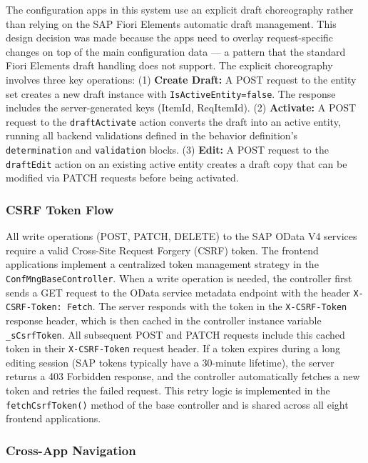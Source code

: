 \documentclass[12pt,a4paper]{report}
\begin{document}
The configuration apps in this system use an explicit draft choreography rather than relying on the SAP Fiori Elements automatic draft management. This design decision was made because the apps need to overlay request-specific changes on top of the main configuration data --- a pattern that the standard Fiori Elements draft handling does not support. The explicit choreography involves three key operations: (1) \textbf{Create Draft:} A POST request to the entity set creates a new draft instance with \texttt{IsActiveEntity=false}. The response includes the server-generated keys (ItemId, ReqItemId). (2) \textbf{Activate:} A POST request to the \texttt{draftActivate} action converts the draft into an active entity, running all backend validations defined in the behavior definition's \texttt{determination} and \texttt{validation} blocks. (3) \textbf{Edit:} A POST request to the \texttt{draftEdit} action on an existing active entity creates a draft copy that can be modified via PATCH requests before being activated.

\subsubsection{CSRF Token Flow}

All write operations (POST, PATCH, DELETE) to the SAP OData V4 services require a valid Cross-Site Request Forgery (CSRF) token. The frontend applications implement a centralized token management strategy in the \texttt{ConfMngBaseController}. When a write operation is needed, the controller first sends a GET request to the OData service metadata endpoint with the header \texttt{X-CSRF-Token: Fetch}. The server responds with the token in the \texttt{X-CSRF-Token} response header, which is then cached in the controller instance variable \texttt{\_sCsrfToken}. All subsequent POST and PATCH requests include this cached token in their \texttt{X-CSRF-Token} request header. If a token expires during a long editing session (SAP tokens typically have a 30-minute lifetime), the server returns a 403 Forbidden response, and the controller automatically fetches a new token and retries the failed request. This retry logic is implemented in the \texttt{fetchCsrfToken()} method of the base controller and is shared across all eight frontend applications.

\subsubsection{Cross-App Navigation}
\end{document}
